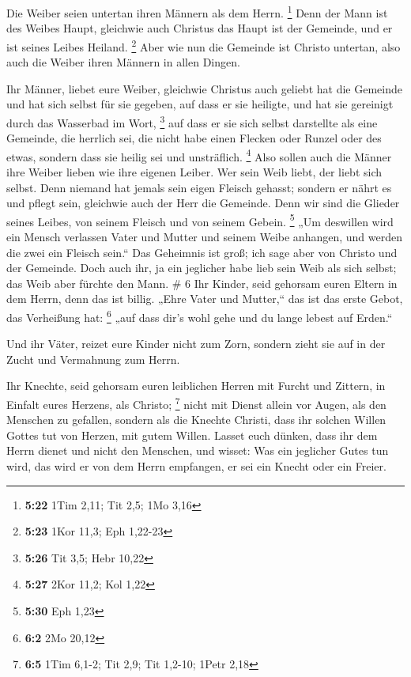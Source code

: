  Die Weiber seien untertan ihren Männern als dem Herrn.
\footnote{\textbf{5:22} 1Tim 2,11; Tit 2,5; 1Mo 3,16}  Denn
der Mann ist des Weibes Haupt, gleichwie auch Christus das Haupt ist der
Gemeinde, und er ist seines Leibes Heiland. \footnote{\textbf{5:23} 1Kor
  11,3; Eph 1,22-23}  Aber wie nun die Gemeinde ist Christo
untertan, also auch die Weiber ihren Männern in allen Dingen.

 Ihr Männer, liebet eure Weiber, gleichwie Christus auch
geliebt hat die Gemeinde und hat sich selbst für sie gegeben,
 auf dass er sie heiligte, und hat sie gereinigt durch das
Wasserbad im Wort, \footnote{\textbf{5:26} Tit 3,5; Hebr 10,22}
 auf dass er sie sich selbst darstellte als eine Gemeinde,
die herrlich sei, die nicht habe einen Flecken oder Runzel oder des
etwas, sondern dass sie heilig sei und unsträflich. \footnote{\textbf{5:27}
  2Kor 11,2; Kol 1,22}  Also sollen auch die Männer ihre
Weiber lieben wie ihre eigenen Leiber. Wer sein Weib liebt, der liebt
sich selbst.  Denn niemand hat jemals sein eigen Fleisch
gehasst; sondern er nährt es und pflegt sein, gleichwie auch der Herr
die Gemeinde.  Denn wir sind die Glieder seines Leibes, von
seinem Fleisch und von seinem Gebein. \footnote{\textbf{5:30} Eph 1,23}
 „Um deswillen wird ein Mensch verlassen Vater und Mutter
und seinem Weibe anhangen, und werden die zwei ein Fleisch sein.``
 Das Geheimnis ist groß; ich sage aber von Christo und der
Gemeinde.  Doch auch ihr, ja ein jeglicher habe lieb sein
Weib als sich selbst; das Weib aber fürchte den Mann. \# 6 
Ihr Kinder, seid gehorsam euren Eltern in dem Herrn, denn das ist
billig.  „Ehre Vater und Mutter,`` das ist das erste Gebot,
das Verheißung hat: \footnote{\textbf{6:2} 2Mo 20,12}  „auf
dass dir's wohl gehe und du lange lebest auf Erden.``

 Und ihr Väter, reizet eure Kinder nicht zum Zorn, sondern
zieht sie auf in der Zucht und Vermahnung zum Herrn.

 Ihr Knechte, seid gehorsam euren leiblichen Herren mit
Furcht und Zittern, in Einfalt eures Herzens, als Christo; \footnote{\textbf{6:5}
  1Tim 6,1-2; Tit 2,9; Tit 1,2-10; 1Petr 2,18}  nicht mit
Dienst allein vor Augen, als den Menschen zu gefallen, sondern als die
Knechte Christi, dass ihr solchen Willen Gottes tut von Herzen, mit
gutem Willen.  Lasset euch dünken, dass ihr dem Herrn dienet
und nicht den Menschen,  und wisset: Was ein jeglicher Gutes
tun wird, das wird er von dem Herrn empfangen, er sei ein Knecht oder
ein Freier.

